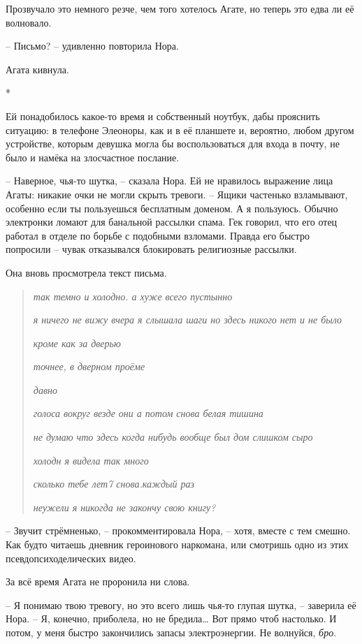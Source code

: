 \documentclass[
  a5paperpaper,
  DIV=11,
  numbers=noendperiod]{scrreprt}
\begin{document}
Прозвучало это немного резче, чем того хотелось Агате, но теперь это
едва ли её волновало.

-- Письмо? -- удивленно повторила Нора.

Агата кивнула.

*

Ей понадобилось какое-то время и собственный ноутбук, дабы прояснить
ситуацию: в телефоне Элеоноры, как и в её планшете и, вероятно, любом
другом устройстве, которым девушка могла бы воспользоваться для входа в
почту, не было и намёка на злосчастное послание.

-- Наверное, чья-то шутка, -- сказала Нора. Ей не нравилось выражение
лица Агаты: никакие очки не могли скрыть тревоги. -- Ящики частенько
взламывают, особенно если ты пользуешься бесплатным доменом. А я
пользуюсь. Обычно электронки ломают для банальной рассылки спама. Гек
говорил, что его отец работал в отделе по борьбе с подобными взломами.
Правда его быстро попросили -- чувак отказывался блокировать религиозные
рассылки.

Она вновь просмотрела текст письма.

\begin{quote}
\emph{так темно и холодно. а хуже всего пустынно}

\emph{я ничего не вижу вчера я слышала шаги но здесь никого нет и не
было}

\emph{кроме как за дверью}

\emph{точнее, в дверном проёме}

\emph{давно}

\emph{голоса вокруг везде они а потом снова белая тишина}

\emph{не думаю что здесь когда нибудь вообще был дом слишком сыро}

\emph{холодн я видела так много}

\emph{сколько тебе лет7 снова.каждый раз}

\emph{неужели я никогда не закончу свою книгу?}
\end{quote}

-- Звучит стрёмненько, -- прокомментировала Нора, -- хотя, вместе с тем
смешно. Как будто читаешь дневник героинового наркомана, или смотришь
одно из этих псевдопсиходелических видео.

За всё время Агата не проронила ни слова.

-- Я понимаю твою тревогу, но это всего лишь чья-то глупая шутка, --
заверила её Нора. -- Я, конечно, приболела, но не бредила\ldots{} Вот
прямо чтоб настолько. И потом, у меня быстро закончились запасы
электроэнергии. Не волнуйся, \emph{бро}.
\end{document}
